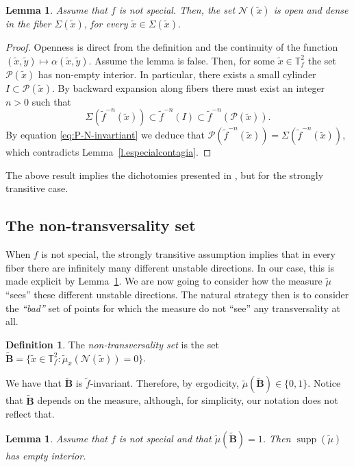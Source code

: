 \documentclass[a4paper,11pt,reqno]{amsart}
\newcommand{\TTf}{{\mathbb{T}_f^2}}
\newcommand{\cN}{{\mathcal N}}
\newcommand{\cP}{{\mathcal P}}
\newcommand{\tix}{\tilde{x}}
\newcommand{\tm}{\tilde{\mu}}
\newtheorem{lemma}[theorem]{Lemma}
\theoremstyle{definition}
\newtheorem{definition}[theorem]{Definition}
\begin{document}
\begin{lemma}
\label{l.contracaomaravilhosa}
Assume that $f$ is not special. Then, the set $\cN(\tix)$ is open and dense in the fiber $\Sigma(\tix)$, for every $\tix\in\Sigma(\tix).$
\end{lemma}
\begin{proof}
Openness is direct from the definition and the continuity of the function $(\tix,\tilde{y})\mapsto \alpha(\tix,\tilde{y})$. Assume the lemma is false. Then, for some $\tix\in\TTf$ the set $\cP(\tix)$ has non-empty interior. In particular, there exists a small cylinder $I\subset\cP(\tix)$. By backward expansion along fibers there must exist an integer $n>0$ such that 
\[
\Sigma(\tilde{f}^{-n}(\tix))\subset\tilde{f}^{-n}(I)\subset\tilde{f}^{-n}(\cP(\tix)).
\] 
By equation \eqref{eq:P-N-invartiant} we deduce that $\cP(\tilde{f}^{-n}(\tix))=\Sigma(\tilde{f}^{-n}(\tix))$, which contradicts Lemma~\ref{l.especialcontagia}.
\end{proof}

The above result implies the dichotomies presented in \cite{CostaMicena2022, MicenaTahzibi2016}, but for the strongly transitive case.
    
\subsection{The non-transversality set}

When $f$ is not special, the strongly transitive assumption implies that in every fiber there are infinitely many different unstable directions. In our case, this is made explicit by Lemma~\ref{l.contracaomaravilhosa}. We are now going to consider how the measure $\tm$ ``sees'' these different unstable directions. The natural strategy then is to consider the \emph{``bad''} set of points for which the measure do not ``see'' any transversality at all.  

\begin{definition}
The \emph{non-transversality set} is the set $\tilde{\mathbf{B}}=\{\tix\in\TTf : \tilde{\mu}_x(\cN(\tix))=0\}$.
\end{definition}

We have that $\tilde{\mathbf{B}}$ is $\tilde{f}$-invariant. Therefore, by ergodicity, $\tilde{\mu}(\tilde{\mathbf{B}})\in\{0,1\}$. Notice that $\tilde{\mathbf{B}}$ depends on the measure, although, for simplicity, our notation does not reflect that.

\begin{lemma}
	\label{l.fakenewslemma}
Assume that $f$ is not special and that $\tilde{\mu}(\tilde{\mathbf{B}})=1$. Then $\operatorname{supp}(\tilde{\mu})$ has empty interior. 
\end{lemma}
\end{document}

